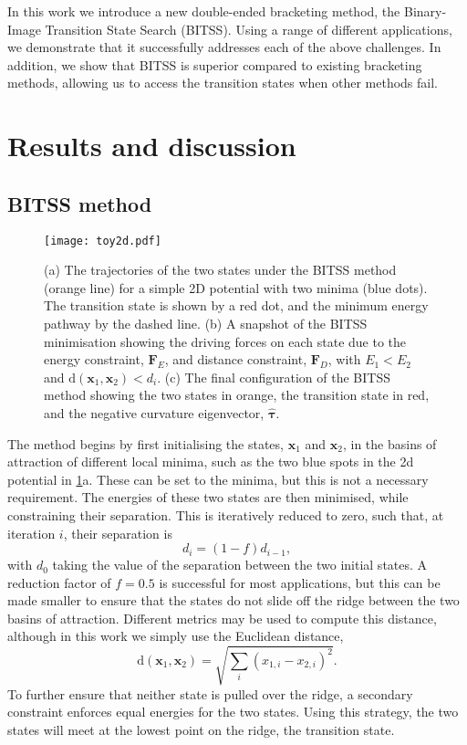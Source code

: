 \documentclass[twocolumn,10pt]{revtex4}
\begin{document}
In this work we introduce a new double-ended bracketing method, the Binary-Image Transition State Search (BITSS).
Using a range of different applications, we demonstrate that it successfully addresses each of the above challenges.
In addition, we show that BITSS is superior compared to existing bracketing methods, allowing us to access the transition states when other methods fail.


\section{Results and discussion}
\subsection{BITSS method}
\begin{figure}[tb]
  \texttt{[image: toy2d.pdf]}
  \caption{\label{fig:toy2d}
    (a) The trajectories of the two states under the BITSS method (orange line) for a simple 2D potential with two minima (blue dots).
        The transition state is shown by a red dot, and the minimum energy pathway by the dashed line.
    (b) A snapshot of the BITSS minimisation showing the driving forces on each state due to the energy constraint, $\bm{F}_E$, and distance constraint, $\bm{F}_D$, with $E_1 < E_2$ and $\mathrm{d}(\bm{x}_1,\bm{x}_2) < d_i$.
    (c) The final configuration of the BITSS method showing the two states in orange, the transition state in red, and the negative curvature eigenvector, $\bm{\hat{\tau}}$.
  }
\end{figure}

The method begins by first initialising the states, $\bm{x}_1$ and $\bm{x}_2$, in the basins of attraction of different local minima, such as the two blue spots in the 2d potential in \cref{fig:toy2d}a.
These can be set to the minima, but this is not a necessary requirement.
The energies of these two states are then minimised, while constraining their separation.
This is iteratively reduced to zero, such that, at iteration $i$, their separation is
\begin{equation}\label{eq:diteration}
  d_i = (1 - f) d_{i-1},
\end{equation}
with $d_0$ taking the value of the separation between the two initial states.
A reduction factor of $f = 0.5$ is successful for most applications, but this can be made smaller to ensure that the states do not slide off the ridge between the two basins of attraction.
Different metrics may be used to compute this distance, although in this work we simply use the Euclidean distance,
\begin{equation}
  \mathrm{d}(\bm{x}_1, \bm{x}_2) = \sqrt{\sum_i (x_{1,i} - x_{2,i})^2}.
\end{equation}
To further ensure that neither state is pulled over the ridge, a secondary constraint enforces equal energies for the two states.
Using this strategy, the two states will meet at the lowest point on the ridge, the transition state.
\end{document}
